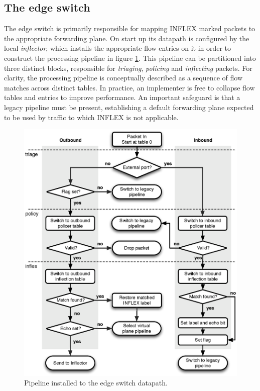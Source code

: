 \subsection{The edge switch}

The edge switch is primarily responsible for mapping INFLEX marked packets to the appropriate forwarding plane.
On start up its datapath is configured by the local \emph{inflector}, which installs the appropriate flow entries on it in order to construct the processing pipeline in figure \ref{fig:pipeline}.
This pipeline can be partitioned into three distinct blocks, responsible for \emph{triaging}, \emph{policing} and \emph{inflecting} packets.
For clarity, the processing pipeline is conceptually described as a sequence of flow matches across distinct tables.
In practice, an implementer is free to collapse flow tables and entries to improve performance.
An important safeguard is that a legacy pipeline must be present, establishing a default forwarding plane expected to be used by traffic to which INFLEX is not applicable.

\begin{figure}
    \centering
    \includegraphics[width=5.0in]{figures/inflex/flowchart}
    \caption{Pipeline installed to the edge switch datapath.}
    \label{fig:pipeline}
\end{figure}

